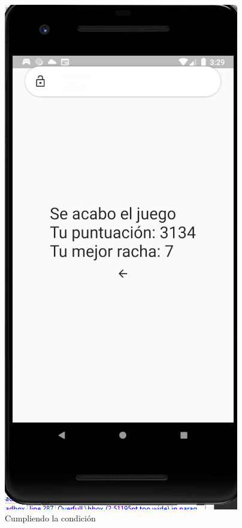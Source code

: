 \documentclass{article}
\begin{document}
\begin{figure}[H]
    \centering
    \includegraphics[scale=0.8]{imgs/Test/LogroDes}
    \caption{Cumpliendo la condición}
\end{figure}
\end{document}
